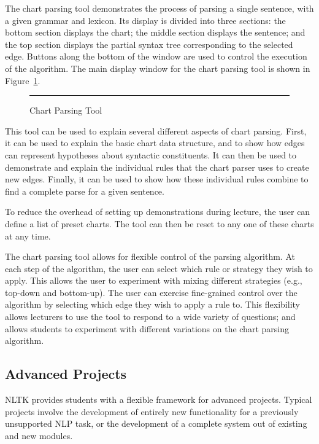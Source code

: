 \documentclass[11pt]{article}
\begin{document}
The chart parsing tool demonstrates the process of parsing a single
sentence, with a given grammar and lexicon.  Its display is divided
into three sections: the bottom section displays the chart; the middle
section displays the sentence; and the top section displays the
partial syntax tree corresponding to the selected edge.  Buttons along
the bottom of the window are used to control the execution of the
algorithm.  The main display window for the chart parsing tool is
shown in Figure~\ref{fig:chartparse}.   

\begin{figure}
\centerline{}
\caption{Chart Parsing Tool}\label{fig:chartparse}
\vspace*{2ex}\hrule
\end{figure}

This tool can be used to explain several different aspects of chart
parsing.  First, it can be used to explain the basic chart data
structure, and to show how edges can represent hypotheses about
syntactic constituents.  It can then be used to demonstrate and
explain the individual rules that the chart parser uses to create new
edges.  Finally, it can be used to show how these individual rules
combine to find a complete parse for a given sentence.

To reduce the overhead of setting up demonstrations during lecture,
the user can define a list of preset charts.  The tool can then be
reset to any one of these charts at any time.

The chart parsing tool allows for flexible control of the parsing
algorithm.  At each step of the algorithm, the user can select which
rule or strategy they wish to apply.  This allows the user to
experiment with mixing different strategies (e.g., top-down and
bottom-up).  The user can exercise fine-grained control over the
algorithm by selecting which edge they wish to apply a rule to.  This
flexibility allows lecturers to use the tool to respond to a wide
variety of questions; and allows students to experiment with different
variations on the chart parsing algorithm.

\subsection{Advanced Projects}

NLTK provides students with a flexible framework for advanced
projects.  Typical projects involve the development of entirely new
functionality for a previously unsupported NLP task, or the
development of a complete system out of existing and new modules.
\end{document}
